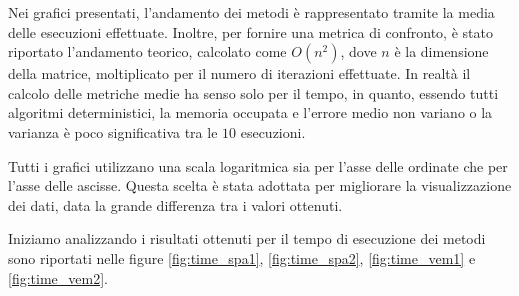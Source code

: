 Nei grafici presentati, l'andamento dei metodi è rappresentato tramite la media
delle esecuzioni effettuate. Inoltre, per fornire una metrica di confronto, è
stato riportato l'andamento teorico, calcolato come $O(n^2)$, dove $n$ è la
dimensione della matrice, moltiplicato per il numero di iterazioni effettuate.
In realtà il calcolo delle metriche medie ha senso solo per il
tempo, in quanto, essendo tutti algoritmi deterministici, la memoria occupata e
l'errore medio non variano o la varianza è poco significativa tra le $10$ esecuzioni.

Tutti i grafici utilizzano una scala logaritmica sia per l'asse delle ordinate
che per l'asse delle ascisse. Questa scelta è stata adottata per migliorare la
visualizzazione dei dati, data la grande differenza tra i valori ottenuti.

Iniziamo analizzando i risultati ottenuti per il tempo di esecuzione dei metodi
sono riportati nelle figure \ref{fig:time_spa1}, \ref{fig:time_spa2}, \ref{fig:time_vem1}
e \ref{fig:time_vem2}.
